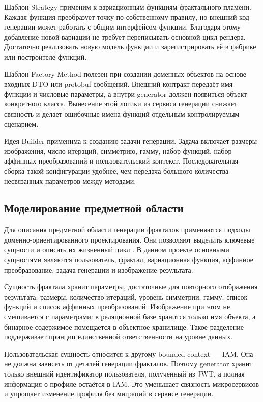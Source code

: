 Шаблон Strategy применим к вариационным функциям фрактального пламени. Каждая функция преобразует точку по собственному правилу, но внешний код генерации может работать с общим интерфейсом функции. Благодаря этому добавление новой вариации не требует переписывать основной цикл рендера. Достаточно реализовать новую модель функции и зарегистрировать её в фабрике или построителе функций.

Шаблон Factory Method полезен при создании доменных объектов на основе входных DTO или protobuf-сообщений. Внешний контракт передаёт имя функции и числовые параметры, а внутри generator должен появиться объект конкретного класса. Вынесение этой логики из сервиса генерации снижает связность и делает ошибочные имена функций отдельным контролируемым сценарием.

Идея Builder применима к созданию задачи генерации. Задача включает размеры изображения, число итераций, симметрию, гамму, набор функций, набор аффинных преобразований и пользовательский контекст. Последовательная сборка такой конфигурации удобнее, чем передача большого количества несвязанных параметров между методами.

\subsection{Моделирование предметной области}

Для описания предметной области генерации фракталов применяются подходы доменно-ориентированного проектирования. Они позволяют выделить ключевые сущности и описать их жизненный цикл \cite{ddd_evans}. В данном проекте основными сущностями являются пользователь, фрактал, вариационная функция, аффинное преобразование, задача генерации и изображение результата.

Сущность фрактала хранит параметры, достаточные для повторного отображения результата: размеры, количество итераций, уровень симметрии, гамму, список функций и список аффинных преобразований. Изображение при этом не смешивается с параметрами: в реляционной базе хранится только имя объекта, а бинарное содержимое помещается в объектное хранилище. Такое разделение поддерживает принцип единственной ответственности на уровне данных.

Пользовательская сущность относится к другому bounded context --- IAM. Она не должна зависеть от деталей генерации фракталов. Поэтому generator хранит только внешний идентификатор пользователя, полученный из JWT, а полная информация о профиле остаётся в IAM. Это уменьшает связность микросервисов и упрощает изменение профиля без миграций в сервисе генерации.

